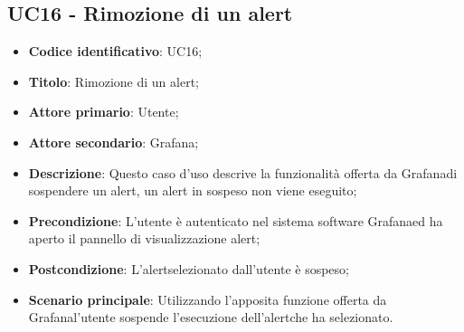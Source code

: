 \subsection{UC16 - Rimozione di un alert}
\begin{itemize}
	\item \textbf{Codice identificativo}: UC16;
	\item \textbf{Titolo}: Rimozione di un alert\glo;
	\item \textbf{Attore primario}: Utente;
	\item \textbf{Attore secondario}: Grafana\glo;
	\item \textbf{Descrizione}: Questo caso d'uso descrive la funzionalità offerta da Grafana\glosp di sospendere un alert\glosp, un alert in sospeso non viene eseguito;
	\item \textbf{Precondizione}: L'utente è autenticato nel sistema software Grafana\glosp ed ha aperto il pannello di visualizzazione alert\glo;
	\item \textbf{Postcondizione}: L'alert\glosp selezionato dall'utente è sospeso;
	\item \textbf{Scenario principale}: Utilizzando l'apposita funzione offerta da Grafana\glosp l'utente sospende l'esecuzione dell'alert\glosp che ha selezionato.
\end{itemize} 
